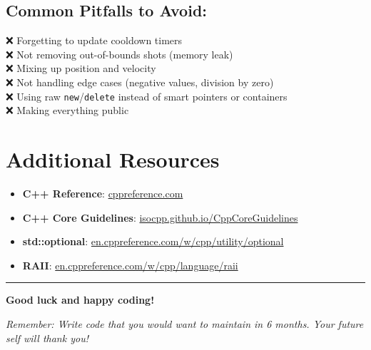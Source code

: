 \documentclass[
]{article}
\providecommand{\tightlist}{%
  \setlength{\itemsep}{0pt}\setlength{\parskip}{0pt}}
\begin{document}
\subsection{Common Pitfalls to Avoid:}\label{common-pitfalls-to-avoid}

❌ Forgetting to update cooldown timers\\
❌ Not removing out-of-bounds shots (memory leak)\\
❌ Mixing up position and velocity\\
❌ Not handling edge cases (negative values, division by zero)\\
❌ Using raw \texttt{new}/\texttt{delete} instead of smart pointers or
containers\\
❌ Making everything public

\section{Additional Resources}\label{additional-resources}

\begin{itemize}
\tightlist
\item
  \textbf{C++ Reference}:
  \href{https://cppreference.com}{cppreference.com}
\item
  \textbf{C++ Core Guidelines}:
  \href{https://isocpp.github.io/CppCoreGuidelines}{isocpp.github.io/CppCoreGuidelines}
\item
  \textbf{std::optional}:
  \href{https://en.cppreference.com/w/cpp/utility/optional}{en.cppreference.com/w/cpp/utility/optional}
\item
  \textbf{RAII}:
  \href{https://en.cppreference.com/w/cpp/language/raii}{en.cppreference.com/w/cpp/language/raii}
\end{itemize}

\begin{center}\rule{0.5\linewidth}{0.5pt}\end{center}

\textbf{Good luck and happy coding!} 🚀

\emph{Remember: Write code that you would want to maintain in 6 months.
Your future self will thank you!}
\end{document}
